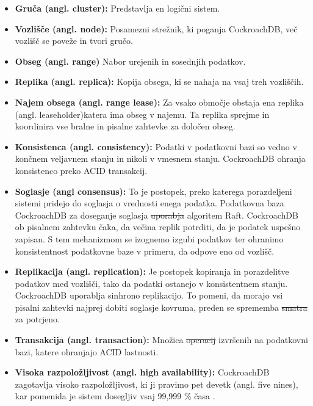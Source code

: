 \documentclass[a4paper, 12pt]{book}
\providecommand{\DIFaddtex}[1]{{\protect\color{blue}\uwave{#1}}} %
\providecommand{\DIFdeltex}[1]{{\protect\color{red}\sout{#1}}}                      %
\providecommand{\DIFaddbegin}{} %
\providecommand{\DIFaddend}{} %
\providecommand{\DIFdelbegin}{} %
\providecommand{\DIFdelend}{} %
\providecommand{\DIFadd}[1]{\texorpdfstring{\DIFaddtex{#1}}{#1}} %
\providecommand{\DIFdel}[1]{\texorpdfstring{\DIFdeltex{#1}}{}} %
\newcommand{\DIFscaledelfig}{0.5}
\newlength{\DIFdelgraphicswidth} %
\newlength{\DIFdelgraphicsheight} %
\newcommand{\DIFaddincludegraphics}[2][]{{\color{blue}\fbox{\DIFOincludegraphics[#1]{#2}}}} %
\newcommand{\DIFdelincludegraphics}[2][]{%
\sbox{\DIFdelgraphicsbox}{\DIFOincludegraphics[#1]{#2}}%
\settoboxwidth{\DIFdelgraphicswidth}{\DIFdelgraphicsbox} %
\settoboxtotalheight{\DIFdelgraphicsheight}{\DIFdelgraphicsbox} %
\scalebox{\DIFscaledelfig}{%
\parbox[b]{\DIFdelgraphicswidth}{\usebox{\DIFdelgraphicsbox}\\[-\baselineskip] \rule{\DIFdelgraphicswidth}{0em}}\llap{\resizebox{\DIFdelgraphicswidth}{\DIFdelgraphicsheight}{%
\setlength{\unitlength}{\DIFdelgraphicswidth}%
\begin{picture}(1,1)%
\thicklines\linethickness{2pt} %
{\color[rgb]{1,0,0}\put(0,0){\framebox(1,1){}}}%
{\color[rgb]{1,0,0}\put(0,0){\line( 1,1){1}}}%
{\color[rgb]{1,0,0}\put(0,1){\line(1,-1){1}}}%
\end{picture}%
}\hspace*{3pt}}} %
} %
\DeclareRobustCommand{\DIFaddbegin}{\DIFOaddbegin \let\includegraphics\DIFaddincludegraphics} %
\DeclareRobustCommand{\DIFaddend}{\DIFOaddend \let\includegraphics\DIFOincludegraphics} %
\DeclareRobustCommand{\DIFdelbegin}{\DIFOdelbegin \let\includegraphics\DIFdelincludegraphics} %
\DeclareRobustCommand{\DIFdelend}{\DIFOaddend \let\includegraphics\DIFOincludegraphics} %
\begin{document}
\begin{itemize}
    \item \textbf{Gruča (angl. cluster):} Predstavlja en logični sistem. 
    \item \textbf{Vozlišče (angl. node):} Posamezni strežnik, ki poganja Cock\-roach\-DB, več vozlišč se poveže in tvori gručo.
    \item \textbf{Obseg (angl. range)} Nabor urejenih in sosednjih podatkov.
    \item \textbf{Replika (angl. replica):} Kopija obsega, ki se nahaja na vsaj treh vozliščih.
    \item \textbf{Najem obsega (angl. range lease):} Za vsako območje obstaja ena replika (angl. leaseholder)\DIFaddbegin \DIFadd{, }\DIFaddend katera ima obseg v najemu. Ta replika sprejme in koordinira vse bralne in pisalne zahtevke za določen obseg.
    \item \textbf{Konsistenca (angl. consistency):} Podatki v podatkovni bazi so vedno v končnem veljavnem stanju in nikoli v vmesnem stanju. Cock\-roach\-DB ohranja konsistenco preko ACID transakcij.
    \item \textbf{Soglasje (angl consensus):} To je postopek, preko katerega porazdeljeni sistemi pridejo do soglasja o vrednosti enega podatka. Podatkovna baza CockroachDB za doseganje soglasja \DIFdelbegin \DIFdel{uporabja }\DIFdelend \DIFaddbegin \DIFadd{uporablja }\DIFaddend algoritem Raft. Cock\-roach\-DB ob pisalnem zahtevku čaka, da večina replik potrditi, da je podatek uspešno zapisan. S tem mehanizmom se izognemo izgubi podatkov ter ohranimo konsistentnost podatkovne baze v primeru, da odpove eno od vozlišč.
    \item \textbf{Replikacija (angl. replication):} Je postopek kopiranja in porazdelitve podatkov med vozlišči, tako da podatki ostanejo v konsistentnem stanju. Cock\-roach\-DB uporablja sinhrono replikacijo. To pomeni, da morajo vsi pisalni zahtevki najprej dobiti soglasje kovruma, preden se sprememba \DIFdelbegin \DIFdel{smatra }\DIFdelend \DIFaddbegin \DIFadd{šteje }\DIFaddend za potrjeno.
    \item \textbf{Transakcija (angl. transaction):} Množica \DIFdelbegin \DIFdel{operacij }\DIFdelend izvršenih \DIFaddbegin \DIFadd{operacij }\DIFaddend na podatkovni bazi, katere ohranjajo ACID lastnosti.
    \item \textbf{Visoka razpoložljivost (angl. high availability):} CockroachDB zagotavlja visoko razpoložljivost, ki ji pravimo pet devetk (angl. five nines), kar pomeni\DIFaddbegin \DIFadd{, }\DIFaddend da je sistem dosegljiv vsaj 99,999 \% časa \cite{CRDB-FAQ}.
\end{itemize}
\end{document}
